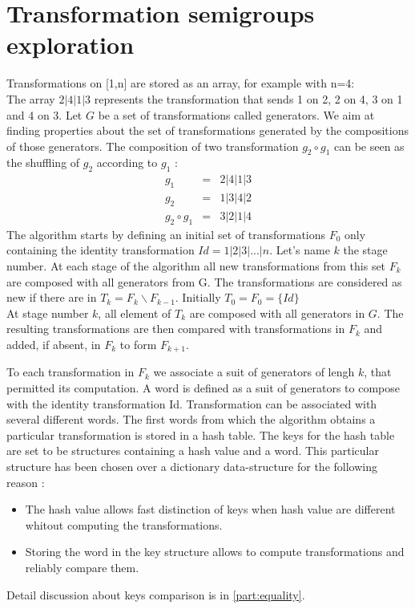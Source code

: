 {\section{Transformation semigroups exploration}
\label{note}
Transformations on [1,n] are stored as an array, for example with n=4:\\
The array $2|4|1|3$ represents the transformation that sends 1 on 2, 2 on 4, 3 on 1 and 4 on 3.
Let $G$ be a set of transformations called generators. We aim at finding properties about the set of transformations generated by the compositions of those generators.
The composition of two transformation $g_2\circ g_1$ can be seen as the shuffling of $g_2$ according to $g_1$ :
\begin{eqnarray*}
g_1 &=& 2|4|1|3\\
g_2 &=& 1|3|4|2\\
g_2\circ g_1 &=& 3|2|1|4
\end{eqnarray*}
The algorithm starts by defining an initial set of transformations $F_0$ only containing the identity transformation $Id = 1|2|3|...|n$.
Let's name $k$ the stage number.
At each stage of the algorithm all new transformations from this set $F_k$ are composed with all generators from G.
The transformations are considered as new if there are in $T_k=F_k \backslash F_{k-1}$.
Initially $T_0 = F_0 = \{Id\}$\\
At stage number $k$, all element of $T_k$ are composed with all generators in $G$. 
The resulting transformations are then compared with transformations in $F_k$ and added, if absent, in $F_k$ to form $F_{k+1}$.

To each transformation in $F_k$ we associate a suit of generators of lengh $k$, that permitted its computation.
A word is defined as a suit of generators to compose with the identity transformation Id.
Transformation can be associated with several different words.
The first words from which the algorithm obtains a particular transformation is stored in a hash table.
The keys for the hash table are set to be structures containing a hash value and a word. 
This particular structure has been chosen over a dictionary data-structure for the following reason :
\begin{itemize}
\item The hash value allows fast distinction of keys when hash value are different whitout computing the transformations.
\item Storing the word in the key structure allows to compute transformations and reliably compare them.
\end{itemize}
Detail discussion about keys comparison is in \autoref{part:equality}.

}
